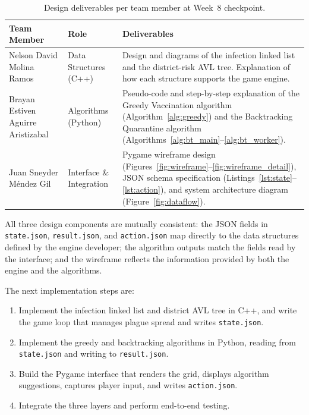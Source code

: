 \documentclass[12pt, a4paper]{article}
\begin{document}
\begin{table}[ht]
\centering
\caption{Design deliverables per team member at Week~8 checkpoint.}
\label{tab:deliverables}
\begin{tabularx}{\linewidth}{|l|l|X|}
\hline
\textbf{Team Member} & \textbf{Role} & \textbf{Deliverables} \\
\hline
Nelson David Molina Ramos &
Data Structures (C++) &
Design and diagrams of the infection linked list and the district-risk AVL
tree. Explanation of how each structure supports the game engine. \\
\hline
Brayan Estiven Aguirre Aristizabal &
Algorithms (Python) &
Pseudo-code and step-by-step explanation of the Greedy Vaccination
algorithm (Algorithm~\ref{alg:greedy}) and the Backtracking Quarantine
algorithm (Algorithms~\ref{alg:bt_main}--\ref{alg:bt_worker}). \\
\hline
Juan Sneyder M\'{e}ndez Gil &
Interface \& Integration &
Pygame wireframe design (Figures~\ref{fig:wireframe}--\ref{fig:wireframe_detail}),
JSON schema specification (Listings~\ref{lst:state}--\ref{lst:action}),
and system architecture diagram (Figure~\ref{fig:dataflow}). \\
\hline
\end{tabularx}
\end{table}

All three design components are mutually consistent: the JSON fields in
\texttt{state.json}, \texttt{result.json}, and \texttt{action.json} map
directly to the data structures defined by the engine developer; the
algorithm outputs match the fields read by the interface; and the wireframe
reflects the information provided by both the engine and the algorithms.

The next implementation steps are:

\begin{enumerate}
  \item Implement the infection linked list and district AVL tree in C++,
        and write the game loop that manages plague spread and writes
        \texttt{state.json}.
  \item Implement the greedy and backtracking algorithms in Python,
        reading from \texttt{state.json} and writing to
        \texttt{result.json}.
  \item Build the Pygame interface that renders the grid, displays
        algorithm suggestions, captures player input, and writes
        \texttt{action.json}.
  \item Integrate the three layers and perform end-to-end testing.
\end{enumerate}
\end{document}
